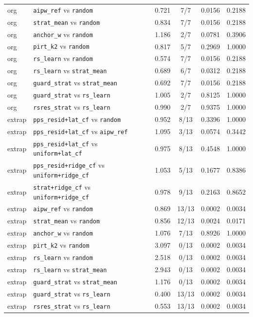 \begin{tabular}{llcccc}
org & \texttt{aipw\_ref} vs \texttt{random} & 0.721 & 7/7 & 0.0156 & 0.2188 \\
org & \texttt{strat\_mean} vs \texttt{random} & 0.834 & 7/7 & 0.0156 & 0.2188 \\
org & \texttt{anchor\_w} vs \texttt{random} & 1.186 & 2/7 & 0.0781 & 0.3906 \\
org & \texttt{pirt\_k2} vs \texttt{random} & 0.817 & 5/7 & 0.2969 & 1.0000 \\
org & \texttt{rs\_learn} vs \texttt{random} & 0.574 & 7/7 & 0.0156 & 0.2188 \\
org & \texttt{rs\_learn} vs \texttt{strat\_mean} & 0.689 & 6/7 & 0.0312 & 0.2188 \\
org & \texttt{guard\_strat} vs \texttt{strat\_mean} & 0.692 & 7/7 & 0.0156 & 0.2188 \\
org & \texttt{guard\_strat} vs \texttt{rs\_learn} & 1.005 & 2/7 & 0.8125 & 1.0000 \\
org & \texttt{rsres\_strat} vs \texttt{rs\_learn} & 0.990 & 2/7 & 0.9375 & 1.0000 \\
\midrule
extrap & \texttt{pps\_resid+lat\_cf} vs \texttt{random} & 0.952 & 8/13 & 0.3396 & 1.0000 \\
extrap & \texttt{pps\_resid+lat\_cf} vs \texttt{aipw\_ref} & 1.095 & 3/13 & 0.0574 & 0.3442 \\
extrap & \texttt{pps\_resid+lat\_cf} vs \texttt{uniform+lat\_cf} & 0.975 & 8/13 & 0.4548 & 1.0000 \\
extrap & \texttt{pps\_resid+ridge\_cf} vs \texttt{uniform+ridge\_cf} & 1.053 & 5/13 & 0.1677 & 0.8386 \\
extrap & \texttt{strat+ridge\_cf} vs \texttt{uniform+ridge\_cf} & 0.978 & 9/13 & 0.2163 & 0.8652 \\
extrap & \texttt{aipw\_ref} vs \texttt{random} & 0.869 & 13/13 & 0.0002 & 0.0034 \\
extrap & \texttt{strat\_mean} vs \texttt{random} & 0.856 & 12/13 & 0.0024 & 0.0171 \\
extrap & \texttt{anchor\_w} vs \texttt{random} & 1.076 & 7/13 & 0.8926 & 1.0000 \\
extrap & \texttt{pirt\_k2} vs \texttt{random} & 3.097 & 0/13 & 0.0002 & 0.0034 \\
extrap & \texttt{rs\_learn} vs \texttt{random} & 2.518 & 0/13 & 0.0002 & 0.0034 \\
extrap & \texttt{rs\_learn} vs \texttt{strat\_mean} & 2.943 & 0/13 & 0.0002 & 0.0034 \\
extrap & \texttt{guard\_strat} vs \texttt{strat\_mean} & 1.176 & 0/13 & 0.0002 & 0.0034 \\
extrap & \texttt{guard\_strat} vs \texttt{rs\_learn} & 0.400 & 13/13 & 0.0002 & 0.0034 \\
extrap & \texttt{rsres\_strat} vs \texttt{rs\_learn} & 0.553 & 13/13 & 0.0002 & 0.0034 \\
\bottomrule
\end{tabular}
